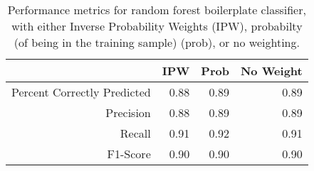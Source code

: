 \begin{table}[ht]
\centering
\begin{tabular}{rrrr}
  \hline
 & IPW & Prob & No Weight \\ 
  \hline
Percent Correctly Predicted & 0.88 & 0.89 & 0.89 \\ 
  Precision & 0.88 & 0.89 & 0.89 \\ 
  Recall & 0.91 & 0.92 & 0.91 \\ 
  F1-Score & 0.90 & 0.90 & 0.90 \\ 
   \hline
\end{tabular}
\caption{Performance metrics for random forest boilerplate classifier, with either Inverse Probability Weights (IPW), probabilty (of being in the training sample) (prob), or no weighting.} 
\end{table}


